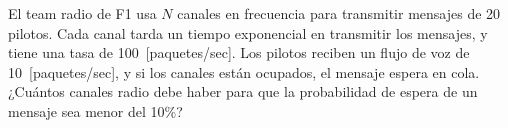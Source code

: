\documentclass{upmassignment}
\begin{document}
\begin{problemlist}
    \pbitem El team radio de F1
    usa $N$ canales en frecuencia para
    transmitir mensajes de 20 pilotos.
    Cada canal tarda un tiempo exponencial
    en transmitir los mensajes, y tiene
    una tasa de 100~[paquetes/sec].
    Los pilotos reciben un flujo de voz de
    10~[paquetes/sec], y si los canales 
    están ocupados, el mensaje espera en cola.
    ¿Cuántos canales radio debe haber para
    que la probabilidad de espera de un
    mensaje sea menor del 10\%?

    \begin{minipage}{\textwidth}
        \centering
        \resizebox{!}{.27\textwidth}{%
            
        }
    \end{minipage}

    \begin{solucion}
        
    \end{solucion}
\end{problemlist}
\end{document}
